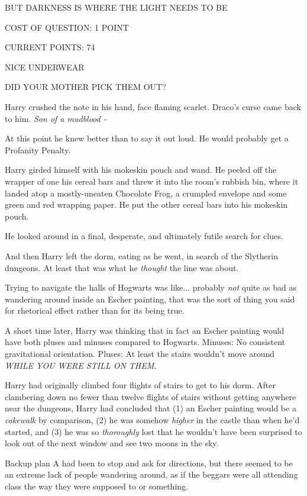 BUT DARKNESS IS WHERE THE LIGHT NEEDS TO BE

COST OF QUESTION: 1 POINT

CURRENT POINTS: 74

NICE UNDERWEAR

DID YOUR MOTHER PICK THEM OUT?

Harry crushed the note in his hand, face flaming scarlet. Draco's curse came back to him. \emph{Son of a mudblood -}

At this point he knew better than to say it out loud. He would probably get a Profanity Penalty.

Harry girded himself with his mokeskin pouch and wand. He peeled off the wrapper of one his cereal bars and threw it into the room's rubbish bin, where it landed atop a mostly-uneaten Chocolate Frog, a crumpled envelope and some green and red wrapping paper. He put the other cereal bars into his mokeskin pouch.

He looked around in a final, desperate, and ultimately futile search for clues.

And then Harry left the dorm, eating as he went, in search of the Slytherin dungeons. At least that was what he \emph{thought} the line was about.

Trying to navigate the halls of Hogwarts was like... probably \emph{not} quite as bad as wandering around inside an Escher painting, that was the sort of thing you said for rhetorical effect rather than for its being true.

A short time later, Harry was thinking that in fact an Escher painting would have both pluses and minuses compared to Hogwarts. Minuses: No consistent gravitational orientation. Pluses: At least the stairs wouldn't move around \emph{WHILE YOU WERE STILL ON THEM.}

Harry had originally climbed four flights of stairs to get to his dorm. After clambering down no fewer than twelve flights of stairs without getting anywhere near the dungeons, Harry had concluded that (1) an Escher painting would be a \emph{cakewalk} by comparison, (2) he was somehow \emph{higher} in the castle than when he'd started, and (3) he was so \emph{thoroughly} lost that he wouldn't have been surprised to look out of the next window and see two moons in the sky.

Backup plan A had been to stop and ask for directions, but there seemed to be an extreme lack of people wandering around, as if the beggars were all attending class the way they were supposed to or something.

